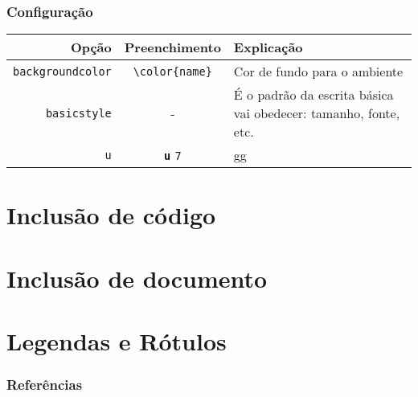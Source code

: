 \documentclass[brazilian]{beamer}
\begin{document}
\begin{frame}[fragile]
    \frametitle{Configuração}
\tiny
    \begin{table}
        \begin{tabular}{rcl}
            Opção & Preenchimento & Explicação \\ \hline
            \texttt{backgroundcolor} & \lstinline[style=myStyleLatex]!\color{name}! & Cor de fundo para o ambiente \\ \hline
            \texttt{basicstyle} & - & É o padrão da escrita básica vai obedecer: tamanho, fonte, etc.  \\ \hline
            \texttt{u} & \texttt{\bfseries u} \texttt{7} & gg \\ \hline
        \end{tabular}
    \end{table}

\end{frame}

\section{Inclusão de código}

\section{Inclusão de documento}

\section{Legendas e Rótulos}

\begin{frame}[allowframebreaks]
    \frametitle{Referências}

    \nocite{*}
    \printbibliography[keyword={inserirCodigos}]

\end{frame}
\end{document}

